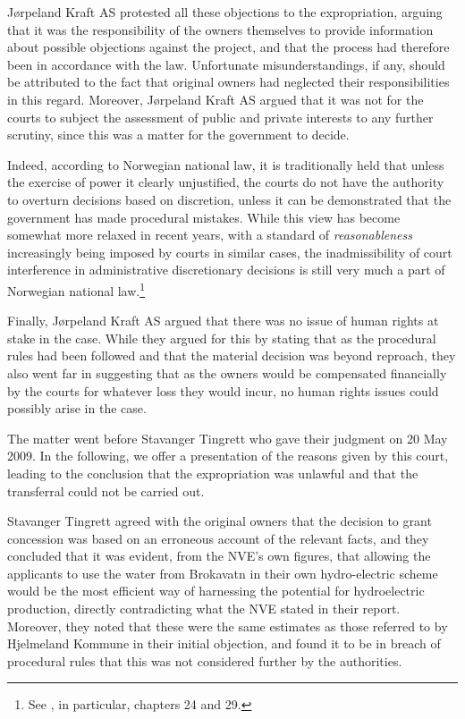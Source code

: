 Jørpeland Kraft AS protested all these objections to the expropriation, arguing that it was the responsibility of the owners themselves to provide information about possible objections against the project, and that the process had therefore been in accordance with the law. Unfortunate misunderstandings, if any, should be attributed to the fact that original owners had neglected their responsibilities in this regard. Moreover, Jørpeland Kraft AS argued that it was not for the courts to subject the assessment of public and private interests to any further scrutiny, since this was a matter for the government to decide. 

Indeed, according to Norwegian national law, it is traditionally held that unless the exercise of power it clearly unjustified, the courts do not have the authority to overturn decisions based on discretion, unless it can be demonstrated that the government has made procedural mistakes. While this view has become somewhat more relaxed in recent years, with a standard of \emph{reasonableness} increasingly being imposed by courts in similar cases, the inadmissibility of court interference in administrative discretionary decisions is still very much a part of Norwegian national law.\footnote{See \cite{Efvl}, in particular, chapters 24 and 29.}

Finally, Jørpeland Kraft AS argued that there was no issue of human rights at stake in the case. While they argued for this by stating that as the procedural rules had been followed and that the material decision was beyond reproach, they also went far in suggesting that as the owners would be compensated financially by the courts for whatever loss they would incur, no human rights issues could possibly arise in the case. 

The matter went before Stavanger Tingrett who gave their judgment on 20 May 2009. In the following, we offer a presentation of the reasons given by this court, leading to the conclusion that the expropriation was unlawful and that the transferral could not be carried out. 

Stavanger Tingrett agreed with the original owners that the decision to grant concession was based on an erroneous account of the relevant facts, and they concluded that it was evident, from the NVE's own figures, that allowing the applicants to use the water from Brokavatn in their own hydro-electric scheme would be the most efficient way of harnessing the potential for hydroelectric production, directly contradicting what the NVE stated in their report. Moreover, they noted that these were the same estimates as those referred to by  Hjelmeland Kommune in their initial objection, and found it to be in breach of procedural rules that this was not considered further by the authorities.

